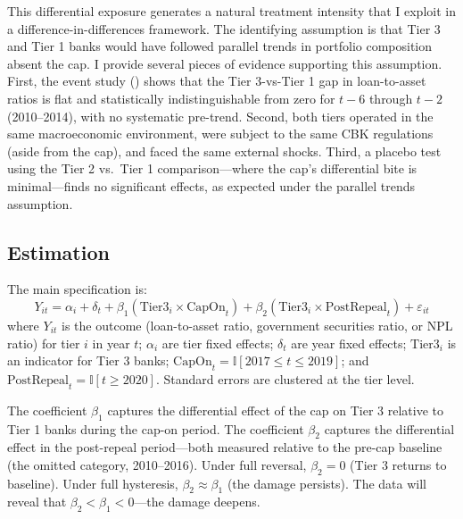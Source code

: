 \documentclass[12pt]{article}
\newcommand{\ind}{\mathbb{I}}
\begin{document}
This differential exposure generates a natural treatment intensity that I exploit in a difference-in-differences framework. The identifying assumption is that Tier 3 and Tier 1 banks would have followed parallel trends in portfolio composition absent the cap. I provide several pieces of evidence supporting this assumption. First, the event study () shows that the Tier 3-vs-Tier 1 gap in loan-to-asset ratios is flat and statistically indistinguishable from zero for $t-6$ through $t-2$ (2010--2014), with no systematic pre-trend. Second, both tiers operated in the same macroeconomic environment, were subject to the same CBK regulations (aside from the cap), and faced the same external shocks. Third, a placebo test using the Tier 2 vs.\ Tier 1 comparison---where the cap's differential bite is minimal---finds no significant effects, as expected under the parallel trends assumption.

\subsection{Estimation}

The main specification is:
\begin{equation}
    Y_{it} = \alpha_i + \delta_t + \beta_1 (\text{Tier3}_i \times \text{CapOn}_t) + \beta_2 (\text{Tier3}_i \times \text{PostRepeal}_t) + \varepsilon_{it}
    \label{eq:main}
\end{equation}
where $Y_{it}$ is the outcome (loan-to-asset ratio, government securities ratio, or NPL ratio) for tier $i$ in year $t$; $\alpha_i$ are tier fixed effects; $\delta_t$ are year fixed effects; $\text{Tier3}_i$ is an indicator for Tier 3 banks; $\text{CapOn}_t = \ind[2017 \leq t \leq 2019]$; and $\text{PostRepeal}_t = \ind[t \geq 2020]$. Standard errors are clustered at the tier level.

The coefficient $\beta_1$ captures the differential effect of the cap on Tier 3 relative to Tier 1 banks during the cap-on period. The coefficient $\beta_2$ captures the differential effect in the post-repeal period---both measured relative to the pre-cap baseline (the omitted category, 2010--2016). Under full reversal, $\beta_2 = 0$ (Tier 3 returns to baseline). Under full hysteresis, $\beta_2 \approx \beta_1$ (the damage persists). The data will reveal that $\beta_2 < \beta_1 < 0$---the damage deepens.
\end{document}
